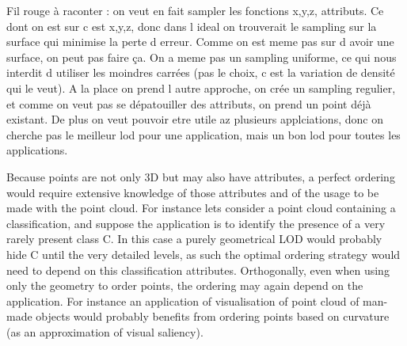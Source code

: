    
	    
	    
	    
	    
	    
		
        Fil rouge à raconter : on veut en fait sampler les fonctions x,y,z, attributs.
        Ce dont on est sur c est x,y,z, donc dans l ideal on trouverait le sampling sur la surface qui minimise la perte d erreur. Comme on est meme pas sur d avoir une surface, on peut pas faire ça. On a meme pas un sampling uniforme, ce qui nous interdit d utiliser les moindres carrées (pas le choix, c est la variation de densité qui le veut).
        A la place on prend l autre approche, on crée un sampling regulier, et comme on veut pas se dépatouiller des attributs, on prend un point déjà existant.
        De plus on veut pouvoir etre utile az plusieurs applciations, donc on cherche pas le meilleur lod pour une application, mais un bon lod pour toutes les applications.
       
        
        Because points are not only 3D but may also have attributes, a perfect ordering would require extensive knowledge of those attributes and of the usage to be made with the point cloud.
        For instance lets consider a point cloud containing a classification, and suppose the application is to identify the presence of a very rarely present class C.
        In this case a purely geometrical LOD would probably hide C until the very detailed levels, as such the optimal ordering strategy would need to depend on this classification attributes.
        Orthogonally, even when using only the geometry to order points, the ordering may again depend on the application. For instance an application of visualisation of point cloud of man-made objects would probably benefits from ordering points based on curvature (as an approximation of visual saliency).
        
